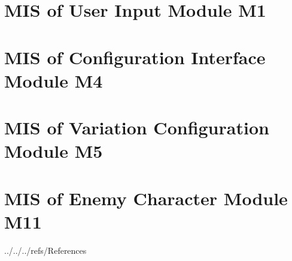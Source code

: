 \documentclass[12pt, titlepage]{article}
\begin{document}




\section{MIS of User Input Module M1} \label{mInput}



\section{MIS of Configuration Interface Module M4} \label{mConfigMenu}

\section{MIS of Variation Configuration Module M5} \label{mConfig}






\section{MIS of Enemy Character Module M11} \label{mEnemy}



\newpage



\newpage


 {../../../refs/References}

\newpage

\newpage{}
\end{document}
